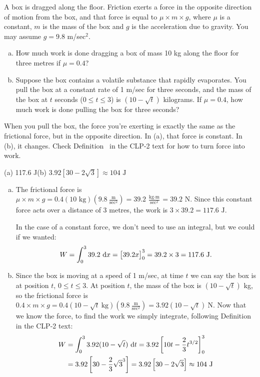 \begin{question}
A box is dragged along the floor. Friction exerts a force in the opposite direction of motion from the box, and that force is equal to $\mu \times m \times g$, where $\mu$ is a constant, $m$ is the mass of the box and $g$ is the acceleration due to gravity. You may assume $g=9.8$ m/sec$^2$.

\begin{enumerate}[(a)]
\item How much work is done dragging a box of mass 10 kg along the floor for three metres if $\mu=0.4$?
\item Suppose the box contains a volatile substance that rapidly evaporates. You pull the box at a constant rate of 1 m/sec for three seconds, and the mass of the box at $t$ seconds ($0 \leq t \leq 3$) is $(10-\sqrt{t})$ kilograms. If $\mu=0.4$, how much work is done pulling the box for three seconds?
\end{enumerate}
\end{question}
\begin{hint}
When you pull the box, the force you're exerting is exactly the same as the frictional force, but in the opposite direction. In (a), that force is constant. In (b), it changes. Check Definition~ in the CLP-2 text for how to turn force into work.
\end{hint}
\begin{answer}
(a) 117.6 J\qquad (b) $3.92\left[30-2\sqrt{3}\right]\approx 104\text{ J}$
\end{answer}
\begin{solution}
\begin{enumerate}[(a)]
\item The frictional force is $\mu \times m \times g = 0.4 \left(10 \text{ kg} \right)\left(9.8 \ \frac{\text{m}}{\text{sec}^2}\right)  = 39.2\ \frac{\text{kg}\cdot\text{m}}{\text{sec}^2} = 39.2\text { N}$. Since this constant force acts over a distance of 3 metres, the work is $3\times 39.2 =117.6 \text{ J} $.

 In the case of a constant force, we don't need to use an integral, but we could if we wanted:
 \[W = \int_0^3 39.2~\mathrm{d}x = \big[39.2x\big]_0^3 = 39.2 \times 3 = 117.6 \text{ J}.\]
\item Since the box is moving at a speed of 1 m/sec, at time $t$ we can say the box is at position $t$, $0 \le t \le 3$. At position $t$, the mass of the box is $(10-\sqrt{t})$ kg, so the frictional force is $0.4 \times m \times g = 0.4\left(10-\sqrt{t}~\text{kg}\right)\left(9.8~\frac{\text{m}}{\text{sec}^2}\right) = 3.92(10-\sqrt t) ~\text{N}$. Now that we know the force, to find the work we simply integrate, following Definition~ in the CLP-2 text:
\begin{align*}
W &= \int_0^3 3.92(10-\sqrt t)\ \mathrm{d}t = 3.92\left[10t-\frac{2}{3}t^{3/2}\right]_0^3 \\
&=3.92\left[30-\frac{2}{3}\sqrt{3}^3\right]=3.92\left[30-2\sqrt{3}\right]\approx 104\text{ J}
\end{align*}
\end{enumerate}
\end{solution}

